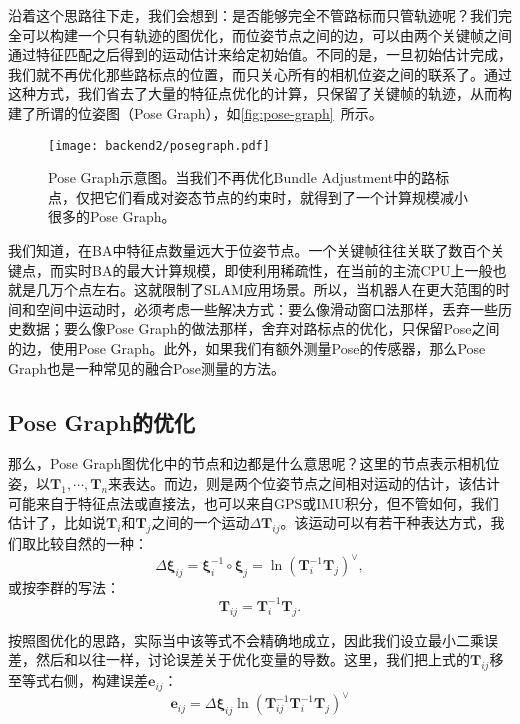 沿着这个思路往下走，我们会想到：是否能够完全不管路标而只管轨迹呢？我们完全可以构建一个只有轨迹的图优化，而位姿节点之间的边，可以由两个关键帧之间通过特征匹配之后得到的运动估计来给定初始值。不同的是，一旦初始估计完成，我们就不再优化那些路标点的位置，而只关心所有的相机位姿之间的联系了。通过这种方式，我们省去了大量的特征点优化的计算，只保留了关键帧的轨迹，从而构建了所谓的位姿图（Pose Graph），如\autoref{fig:pose-graph}~所示。

\begin{figure}[!ht]
	\centering
	\texttt{[image: backend2/posegraph.pdf]}
	\caption{Pose Graph示意图。当我们不再优化Bundle Adjustment中的路标点，仅把它们看成对姿态节点的约束时，就得到了一个计算规模减小很多的Pose Graph。}
	\label{fig:pose-graph}
\end{figure}

我们知道，在BA中特征点数量远大于位姿节点。一个关键帧往往关联了数百个关键点，而实时BA的最大计算规模，即使利用稀疏性，在当前的主流CPU上一般也就是几万个点左右。这就限制了SLAM应用场景。所以，当机器人在更大范围的时间和空间中运动时，必须考虑一些解决方式：要么像滑动窗口法那样，丢弃一些历史数据\textsuperscript{\cite{Strasdat2011}}；要么像Pose Graph的做法那样，舍弃对路标点的优化，只保留Pose之间的边，使用Pose Graph\textsuperscript{\cite{Dubbelman2015, Lee2014, Latif2013}}。此外，如果我们有额外测量Pose的传感器，那么Pose Graph也是一种常见的融合Pose测量的方法。


\subsection{Pose Graph的优化}
那么，Pose Graph图优化中的节点和边都是什么意思呢？这里的节点表示相机位姿，以$\bm{T}_1, \cdots, \bm{T}_n$来表达。而边，则是两个位姿节点之间相对运动的估计，该估计可能来自于特征点法或直接法，也可以来自GPS或IMU积分，但不管如何，我们估计了，比如说$\bm{T}_i$和$\bm{T}_j$之间的一个运动$\Delta \bm{T}_{ij}$。该运动可以有若干种表达方式，我们取比较自然的一种：
\begin{equation}
\Delta \bm{\xi}_{ij} = \bm{\xi}_i^{-1} \circ \bm{\xi}_j = \ln \left( \bm{T}_i^{-1} \bm{T}_j \right)^\vee,
\end{equation}
或按李群的写法：
\begin{equation}
\bm{T}_{ij} =\bm{T}_i^{-1} \bm{T}_j.
\end{equation}

按照图优化的思路，实际当中该等式不会精确地成立，因此我们设立最小二乘误差，然后和以往一样，讨论误差关于优化变量的导数。这里，我们把上式的$\bm{T}_{ij}$移至等式右侧，构建误差$\bm{e}_{ij}$：
\begin{equation}
\bm{e}_{ij} = \Delta \bm{\xi}_{ij} \ln \left( \bm{T}_{ij}^{-1} \bm{T}_i^{-1} \bm{T}_j \right)^\vee
\end{equation}

